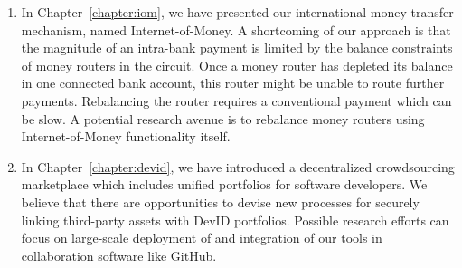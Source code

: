 \begin{enumerate}
	\item In Chapter~\ref{chapter:iom}, we have presented our international money transfer mechanism, named Internet-of-Money.
	A shortcoming of our approach is that the magnitude of an intra-bank payment is limited by the balance constraints of money routers in the circuit.
	Once a money router has depleted its balance in one connected bank account, this router might be unable to route further payments.
	Rebalancing the router requires a conventional payment which can be slow.
	A potential research avenue is to rebalance money routers using Internet-of-Money functionality itself.
	
	\item In Chapter~\ref{chapter:devid}, we have introduced a decentralized crowdsourcing marketplace which includes unified portfolios for software developers.
	We believe that there are opportunities to devise new processes for securely linking third-party assets with DevID portfolios.
	Possible research efforts can focus on large-scale deployment of \Dappcoder{} and integration of our tools in collaboration software like GitHub.
\end{enumerate}